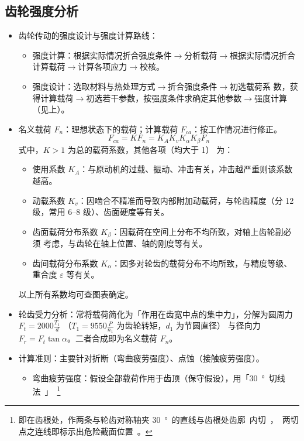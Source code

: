 \documentclass[12pt,a4paper]{article}
\newcommand{\tightlist}{\setlength{\parskip}{0pt}\setlength{\itemsep}{0pt}}
\newcommand{\hint}[1]{\textsf{（#1）}}
\newcommand{\minor}[1]{{\color{gray} #1}}
\newcommand{\then}{$\to$}
\begin{document}
\subsection{齿轮强度分析}
\begin{itemize}\tightlist
    \item 齿轮传动的强度设计与强度计算路线：
    \begin{itemize}\tightlist
        \item 强度计算：根据实际情况折合强度条件\then 分析载荷\then 根据实际情况折合
        计算载荷\then 计算各项应力\then 校核。
        \item \minor{强度设计：选取材料与热处理方式\then 折合强度条件\then 初选载荷系
        数，获得计算载荷\then 初选若干参数，按强度条件求确定其他参数\then 强度计算
        \hint{见上}。}
    \end{itemize}
    \item 名义载荷 $F_n$：理想状态下的载荷；计算载荷 $F_{ca}$：按工作情况进行修正。
    \[F_{ca}=KF_n=K_AK_vK_\alpha K_\beta F_n\]
    式中，$K>1$ 为总的载荷系数，其他各项\hint{均大于 1} 为：
    \begin{itemize}\tightlist
        \item 使用系数 $K_A$：与原动机的过载、振动、冲击有关，冲击越严重则该系数越高。
        \item 动载系数 $K_v$：因啮合不精准而导致内部附加动载荷，与轮齿精度\hint{分 12
        级，常用 6--8 级}、齿面硬度等有关。
        \item 齿面载荷分布系数 $K_\beta$：因载荷在空间上分布不均所致，对轴上齿轮副必须
        考虑，与齿轮在轴上位置、轴的刚度等有关。
        \item 齿间载荷分布系数 $K_\alpha$：因多对轮齿的载荷分布不均所致，与精度等级、
        重合度 $\varepsilon$ 等有关。
    \end{itemize}
    以上所有系数均可查图表确定。
    \item 轮齿受力分析：常将载荷简化为「作用在齿宽中点的集中力」，分解为圆周力 $F_t=
    2000\frac{T_1}{d}$ \hint{$T_1=9550\frac{P}{n_1}$ 为齿轮转矩，$d_1$ 为节圆直径}
    与径向力 $F_r=F_t\tan\alpha$。二者合成即为名义载荷 $F_n$。
    \item 计算准则：主要针对折断\hint{弯曲疲劳强度}、点蚀\hint{接触疲劳强度}。
    \begin{itemize}\tightlist
        \item 弯曲疲劳强度：假设全部载荷作用于齿顶\hint{保守假设}，用「\SI{30}\degree
        切线法」
        \footnote{即在齿根处，作两条与轮齿对称轴夹 \SI{30}\degree 的直线与齿根处齿廓
        内切，两切点之连线即标示出危险截面位置。}

\end{itemize}
\end{itemize}
\end{document}
